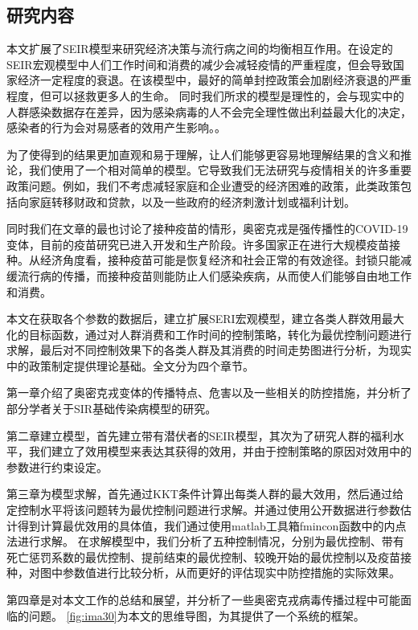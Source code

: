 \subsection{研究内容}
本文扩展了SEIR模型来研究经济决策与流行病之间的均衡相互作用。在设定的SEIR宏观模型中人们工作时间和消费的减少会减轻疫情的严重程度，但会导致国家经济一定程度的衰退。在该模型中，最好的简单封控政策会加剧经济衰退的严重程度，但可以拯救更多人的生命。
同时我们所求的模型是理性的，会与现实中的人群感染数据存在差异，因为感染病毒的人不会完全理性做出利益最大化的决定，感染者的行为会对易感者的效用产生影响。\cite{garibaldi2020modelling}。

为了使得到的结果更加直观和易于理解，让人们能够更容易地理解结果的含义和推论，我们使用了一个相对简单的模型。它导致我们无法研究与疫情相关的许多重要政策问题。例如，我们不考虑减轻家庭和企业遭受的经济困难的政策，此类政策包括向家庭转移财政和贷款，以及一些政府的经济刺激计划或福利计划。

同时我们在文章的最也讨论了接种疫苗的情形，奥密克戎是强传播性的COVID-19变体，目前的疫苗研究已进入开发和生产阶段。许多国家正在进行大规模疫苗接种。从经济角度看，接种疫苗可能是恢复经济和社会正常的有效途径。封锁只能减缓流行病的传播，而接种疫苗则能防止人们感染疾病，从而使人们能够自由地工作和消费。

本文在获取各个参数的数据后，建立扩展SERI宏观模型，建立各类人群效用最大化的目标函数，通过对人群消费和工作时间的控制策略，转化为最优控制问题进行求解，最后对不同控制效果下的各类人群及其消费的时间走势图进行分析，为现实中的政策制定提供理论基础。全文分为四个章节。

第一章介绍了奥密克戎变体的传播特点、危害以及一些相关的防控措施，并分析了部分学者关于SIR基础传染病模型的研究。

第二章建立模型，首先建立带有潜伏者的SEIR模型，其次为了研究人群的福利水平，我们建立了效用模型来表达其获得的效用，并由于控制策略的原因对效用中的参数进行约束设定。

第三章为模型求解，首先通过KKT条件计算出每类人群的最大效用，然后通过给定控制水平将该问题转为最优控制问题进行求解。并通过使用公开数据进行参数估计得到计算最优效用的具体值，我们通过使用matlab工具箱fmincon函数中的内点法进行求解。
在求解模型中，我们分析了五种控制情况，分别为最优控制、带有死亡惩罚系数的最优控制、提前结束的最优控制、较晚开始的最优控制以及疫苗接种，对图中参数值进行比较分析，从而更好的评估现实中防控措施的实际效果。

第四章是对本文工作的总结和展望，并分析了一些奥密克戎病毒传播过程中可能面临的问题。
\autoref{fig:ima30}为本文的思维导图，为其提供了一个系统的框架。

